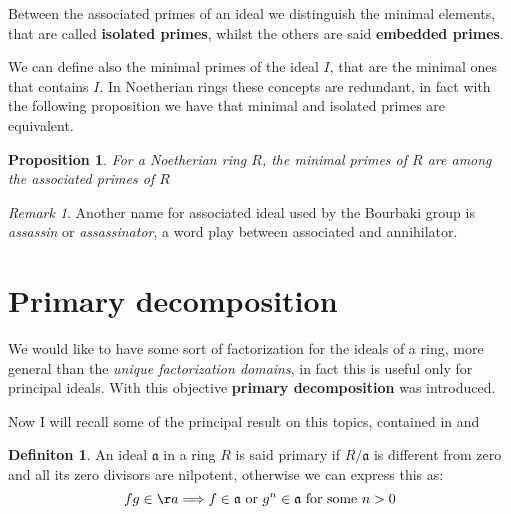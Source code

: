 \documentclass[notitlepage, a4]{book}
\theoremstyle{plain}
\newtheorem{prop}[teo]{Proposition}
\theoremstyle{remark}
\newtheorem{rem}{Remark}
\theoremstyle{definition}
\newtheorem{deff}[teo]{Definiton}
\newcommand{\A}{\mathfrak{a}}
\newcounter{que}
\begin{document}
Between the associated primes of an ideal we distinguish the minimal elements, that are called \textbf{isolated primes}, whilst the others are said \textbf{embedded primes}.

We can define also the minimal primes of the ideal $ I $, that are the minimal ones that contains $ I $. In Noetherian rings these concepts are redundant, in fact with the following proposition we have that minimal and isolated primes are equivalent. 

\begin{prop} \label{prop:minprimes}
	For a Noetherian ring $ R$, the minimal primes of $ R $ are among the associated primes of $ R $
\end{prop}

%
%

\begin{rem}
	Another name for associated ideal used by the Bourbaki group is \textit{assassin} or \textit{assassinator}, a word play between associated and annihilator. %
\end{rem}

\section{Primary decomposition}

We would like to have some sort of factorization for the ideals of a ring, more general than the \textit{unique factorization domains}, in fact this is useful only for principal ideals. With this objective \textbf{primary decomposition} was introduced. 

Now I will recall some of the principal result on this topics, contained in \cite[Section 7]{Reid} and \cite[Section 4 and Page 83]{AMCD}

\begin{deff}
	An ideal $ \A $ in a ring $ R $ is said primary if $ R/\A$ is different from zero and all its zero divisors are nilpotent, otherwise we can express this as:
	\begin{equation*}
		fg \in \aa \Longrightarrow f \in \A \text{ or } g^n \in \A \text{ for some } n >0
	\end{equation*}
\end{deff}
\end{document}
